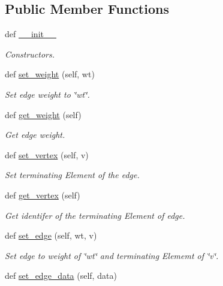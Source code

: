 \subsection*{Public Member Functions}
\begin{DoxyCompactItemize}
\item 
def \hyperlink{class_bridges_1_1edge_1_1_edge_a5e55af43202cf2d6a0e433481d422788}{\+\_\+\+\_\+init\+\_\+\+\_\+}
\begin{DoxyCompactList}\small\item\em Constructors. \end{DoxyCompactList}\item 
def \hyperlink{class_bridges_1_1edge_1_1_edge_a6e6cd15ddf1a1550edbdcc947b8bf52c}{set\+\_\+weight} (self, wt)
\begin{DoxyCompactList}\small\item\em Set edge weight to \char`\"{}wt\char`\"{}. \end{DoxyCompactList}\item 
def \hyperlink{class_bridges_1_1edge_1_1_edge_a014aeea3de184a001bc0dec8c4c76189}{get\+\_\+weight} (self)
\begin{DoxyCompactList}\small\item\em Get edge weight. \end{DoxyCompactList}\item 
def \hyperlink{class_bridges_1_1edge_1_1_edge_a8d8d9c805341d0d6dd45210d740d7de1}{set\+\_\+vertex} (self, v)
\begin{DoxyCompactList}\small\item\em Set terminating Element of the edge. \end{DoxyCompactList}\item 
def \hyperlink{class_bridges_1_1edge_1_1_edge_a68e890b1ad5a01ef69bee809b7b526d1}{get\+\_\+vertex} (self)
\begin{DoxyCompactList}\small\item\em Get identifer of the terminating Element of edge. \end{DoxyCompactList}\item 
def \hyperlink{class_bridges_1_1edge_1_1_edge_aa65288b314e414374bc3d2e0a0792c03}{set\+\_\+edge} (self, wt, v)
\begin{DoxyCompactList}\small\item\em Set edge to weight of \char`\"{}wt\char`\"{} and terminating Elememt of \char`\"{}v\char`\"{}. \end{DoxyCompactList}\item 
def \hyperlink{class_bridges_1_1edge_1_1_edge_aa9ca872601b29ed48d492c7a54a1cc42}{set\+\_\+edge\+\_\+data} (self, data)

\end{DoxyCompactItemize}
